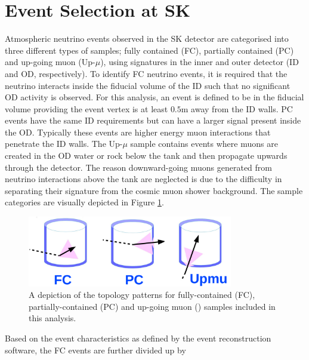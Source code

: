 \section{Event Selection at SK}
\label{sec:Selections_Selection}

Atmospheric neutrino events observed in the SK detector are categorised into three different types of samples; fully contained (FC), partially contained (PC) and up-going muon (Up-$\mu$), using signatures in the inner and outer detector (ID and OD, respectively). To identify FC neutrino events, it is required that the neutrino interacts inside the fiducial volume of the ID such that no significant OD activity is observed. For this analysis, an event is defined to be in the fiducial volume providing the event vertex is at least $0.5$m away from the ID walls. PC events have the same ID requirements but can have a larger signal present inside the OD. Typically these events are higher energy muon interactions that penetrate the ID walls. The Up-$\mu$ sample contains events where muons are created in the OD water or rock below the tank and then propagate upwards through the detector. The reason downward-going muons generated from neutrino interactions above the tank are neglected is due to the difficulty in separating their signature from the cosmic muon shower background. The sample categories are visually depicted in Figure \ref{fig:Selection_AtmosphericSampleTopology}.

\begin{figure}[ht!]
    \centering
    \includegraphics[width=0.8\textwidth]{Figures/Selections/Atmo_topology.pdf}
    \caption{A depiction of the topology patterns for fully-contained (FC), partially-contained (PC) and up-going muon () samples included in this analysis.}
    \label{fig:Selection_AtmosphericSampleTopology}
\end{figure}

Based on the event characteristics as defined by the \fq event reconstruction software, the FC events are further divided up by

